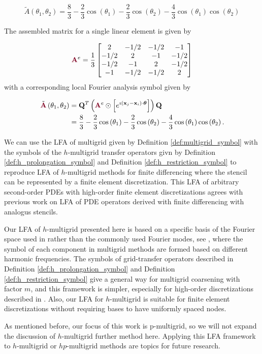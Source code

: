 \begin{equation}
\tilde{A} \left( \theta_1, \theta_2 \right) = \frac{8}{3} - \frac{2}{3} \cos \left( \theta_1 \right) - \frac{2}{3} \cos \left( \theta_2 \right) - \frac{4}{3} \cos \left( \theta_1 \right) \cos \left( \theta_2 \right)
\end{equation}

The assembled matrix for a single linear element is given by

\begin{equation}
{\color{burgundy}\mathbf{A}}^e =
\frac{1}{3}
\begin{bmatrix}
 2    &  -1/2  &  -1/2  &  -1    \\
-1/2  &   2    &  -1    &  -1/2  \\
-1/2  &  -1    &   2    &  -1/2  \\
-1    &  -1/2  &  -1/2  &   2    \\
\end{bmatrix}
\end{equation}
with a corresponding local Fourier analysis symbol given by

\begin{equation}
\begin{split}
\tilde{\color{burgundy}\mathbf{A}} \left( \theta_1, \theta_2 \right) & = \mathbf{Q}^T \left( {\color{burgundy}\mathbf{A}}^e \odot \left[ e^{\imath \left( \mathbf{x}_j - \mathbf{x}_i \right) \cdot \boldsymbol{\theta}} \right] \right) \mathbf{Q}\\ & = \frac{8}{3} - \frac{2}{3} \cos \left( \theta_1 \right) - \frac{2}{3} \cos \left( \theta_2 \right) - \frac{4}{3} \cos \left( \theta_1 \right) \cos \left( \theta_2 \right).
\end{split}
\end{equation}

We can use the LFA of multigrid given by Definition \ref{def:multigrid_symbol} with the symbols of the $h$-multigrid transfer operators givn by Definition \ref{def:h_prolongation_symbol} and Definition \ref{def:h_restriction_symbol} to reproduce LFA of $h$-multigrid methods for finite differencing where the stencil can be represented by a finite element discretization.
This LFA of arbitrary second-order PDEs with high-order finite element discretizations agrees with previous work on LFA of PDE operators derived with finite differencing with analogus stencils.

Our LFA of $h$-multigrid presented here is based on a specific basis of the Fourier space used in \cite{kumar2019local} rather than the commonly used Fourier modes, see \cite{MR1807961,wienands2004practical}, where the symbol of each component in multigrid methods are formed based on different harmonic frequencies.
The symbols of grid-transfer operators described in Definition \ref{def:h_prolongation_symbol} and Definition \ref{def:h_restriction_symbol} give a general way for multigrid coarsening with factor $m$, and this framework is simpler, especially for high-order discretizations described in \cite{he2020two}.
Also, our LFA for $h$-multigrid is suitable for finite element discretizations without requiring bases to have uniformly spaced nodes.

As mentioned before, our focus of this work is p-multigrid, so we will not expand the discussion of $h$-multigrid further method here.
Applying this LFA framework to $h$-multigrid or $hp$-multigrid methods are topics for future research.
